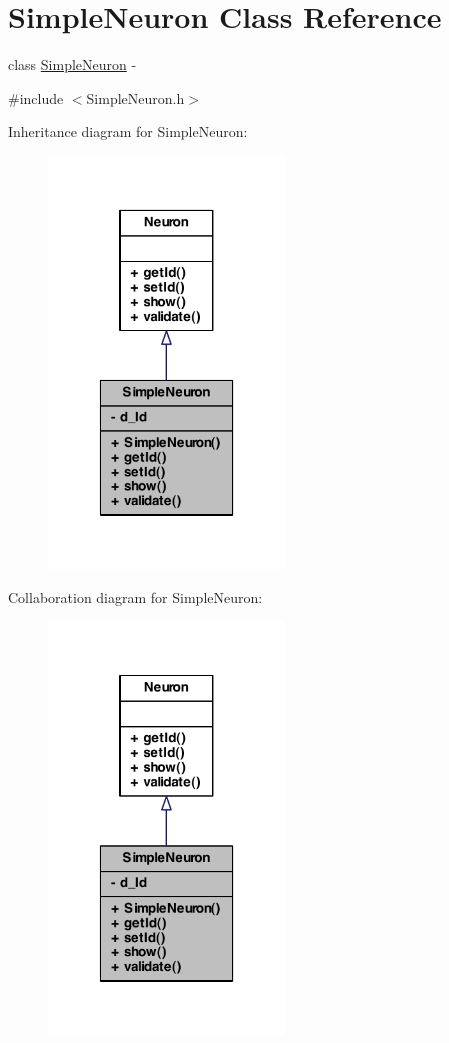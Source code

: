 \hypertarget{class_simple_neuron}{
\section{SimpleNeuron Class Reference}
\label{class_simple_neuron}
}


class \hyperlink{class_simple_neuron}{SimpleNeuron} -\/  




{\ttfamily \#include $<$SimpleNeuron.h$>$}



Inheritance diagram for SimpleNeuron:
\nopagebreak
\begin{figure}[H]
\begin{center}
\leavevmode
\includegraphics[width=178pt]{class_simple_neuron__inherit__graph}
\end{center}
\end{figure}


Collaboration diagram for SimpleNeuron:
\nopagebreak
\begin{figure}[H]
\begin{center}
\leavevmode
\includegraphics[width=178pt]{class_simple_neuron__coll__graph}
\end{center}
\end{figure}
